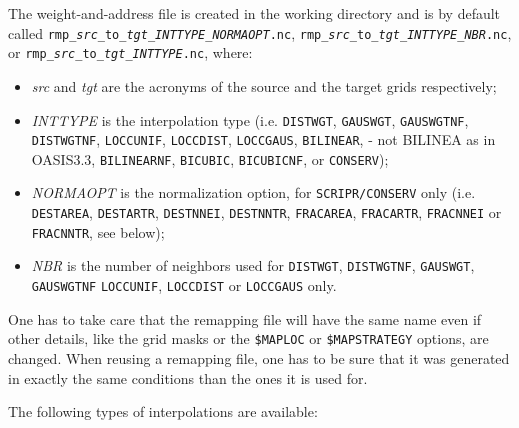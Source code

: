   The weight-and-address file is created in the
  working directory and is by default called \newline 
  {\tt rmp\_{\it src}\_to\_{\it tgt}\_{\it INTTYPE}\_{\it NORMAOPT}.nc}, 
  {\tt rmp\_{\it src}\_to\_{\it tgt}\_{\it INTTYPE}\_{\it NBR}.nc}, \newline or 
  {\tt rmp\_{\it src}\_to\_{\it tgt}\_{\it INTTYPE}.nc}, where:
\begin{itemize}
\item  {\it src} and {\it tgt} are the acronyms of the source and the target
  grids respectively;
\item {\it INTTYPE} is the interpolation type (i.e. {\tt DISTWGT},
  {\tt GAUSWGT}, {\tt GAUSWGTNF},  {\tt DISTWGTNF}, {\tt LOCCUNIF}, {\tt LOCCDIST}, {\tt LOCCGAUS}, {\tt BILINEAR}, - not BILINEA as in OASIS3.3, 
  {\tt BILINEARNF}, {\tt BICUBIC}, {\tt BICUBICNF}, or
  {\tt CONSERV});
\item {\it NORMAOPT} is the normalization
  option, for {\tt SCRIPR/CONSERV} only (i.e. {\tt DESTAREA}, {\tt DESTARTR}, {\tt DESTNNEI}, {\tt DESTNNTR}, {\tt FRACAREA}, {\tt FRACARTR},  {\tt FRACNNEI} or {\tt FRACNNTR}, see below);
\item {\it NBR} is the number of
  neighbors used for {\tt DISTWGT}, {\tt DISTWGTNF}, {\tt GAUSWGT},
  {\tt GAUSWGTNF}  {\tt LOCCUNIF}, {\tt LOCCDIST} or {\tt LOCCGAUS} only.
\end{itemize}
  One has to take care that the
  remapping file will have the same name even if other details, like
  the grid masks or the {\tt \$MAPLOC} or {\tt \$MAPSTRATEGY} options, 
  are changed. When reusing a remapping file, one has
  to be sure that it was generated in exactly the same conditions than
  the ones it is used for.

  The following types of interpolations are available:

